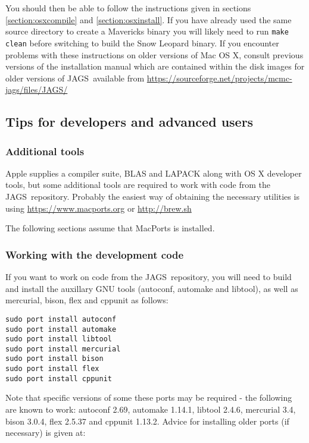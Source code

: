 \documentclass[11pt, a4paper, titlepage]{article}
\newcommand{\JAGS}{\textsf{JAGS}}
\begin{document}
You should then be able to follow the instructions given in sections \ref{section:osxcompile}
and \ref{section:osxinstall}.  If you have already used the same source directory to create
a Mavericks binary you will likely need to run \texttt{make clean} before switching
to build the Snow Leopard binary. If you encounter problems with these instructions on 
older versions of Mac OS X, consult previous versions of the installation manual 
which are contained within the disk images for older versions of \JAGS\ available from
\url{https://sourceforge.net/projects/mcmc-jags/files/JAGS/}


\subsection{Tips for developers and advanced users}

\subsubsection{Additional tools}
\label{section:osxtools}

Apple supplies a compiler suite, BLAS and LAPACK along with OS X developer tools, but some
additional tools are required to work with code from the \JAGS\ repository.  Probably 
the easiest way of obtaining the necessary utilities is using
\url{https://www.macports.org} or \url{http://brew.sh} 

The following sections assume that MacPorts is installed.

\subsubsection{Working with the development code}

If you want to work on code from the \JAGS\ repository, you will need to
build and install the auxillary GNU tools (autoconf, automake and
libtool), as well as mercurial, bison, flex and cppunit as follows:

\begin{verbatim}
sudo port install autoconf
sudo port install automake
sudo port install libtool
sudo port install mercurial
sudo port install bison
sudo port install flex
sudo port install cppunit
\end{verbatim}

Note that specific versions of some these ports may be required - the following 
are known to work:  autoconf 2.69, automake 1.14.1, libtool 2.4.6, 
mercurial 3.4, bison 3.0.4, flex 2.5.37 and cppunit 1.13.2.  Advice for
installing older ports (if necessary) is given at:
\end{document}
